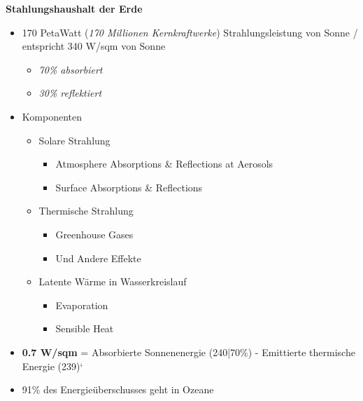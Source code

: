 \documentclass[fontsize=8pt, a4paper, landscape, fleqn]{scrartcl}
\renewcommand{\subsection}[1]{%
    \noindent\colorbox{subsectioncolor}{%
        \parbox{\dimexpr\columnwidth-2\fboxsep}{\color{white}\textbf{#1}}}%
    \vspace{0.5mm}%
}
\begin{document}
\begin{multicols*}{3}[\raggedcolumns]
\subsection{Stahlungshaushalt der Erde}
\begin{itemize}
    \item 170 PetaWatt (\textit{170 Millionen Kernkraftwerke}) Strahlungsleistung von Sonne / entspricht 340 W/sqm von Sonne
        \begin{itemize}
            \item \textit{70\% absorbiert}
            \item \textit{30\% reflektiert}
        \end{itemize}
    \item Komponenten
        \begin{itemize}
            \item Solare Strahlung
                \begin{itemize}
                    \item Atmosphere Absorptions \& Reflections at Aerosols
                    \item Surface Absorptions \& Reflections
                \end{itemize}
            \item Thermische Strahlung
                \begin{itemize}
                    \item Greenhouse Gases
                    \item Und Andere Effekte
                \end{itemize}
            \item Latente Wärme in Wasserkreislauf
                \begin{itemize}
                    \item Evaporation
                    \item Sensible Heat
                \end{itemize}
        \end{itemize}
    \item \textbf{0.7 W/sqm} = Absorbierte Sonnenenergie (240|70\%) - Emittierte thermische Energie (239)`
    \item 91\% des Energieüberschusses geht in Ozeane 

\end{itemize}
\end{multicols*}
\end{document}
